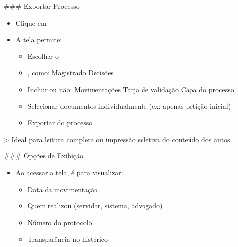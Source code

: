 \documentclass[letterpaper,10pt,brazil]{sphinxmanual}
\begin{document}
\sphinxAtStartPar
\#\#\# Exportar Processo
\begin{itemize}
\item {} 
\sphinxAtStartPar
Clique em 

\item {} 
\sphinxAtStartPar
A tela permite:
\begin{itemize}
\item {} 
\sphinxAtStartPar
Escolher o 

\item {} 
\sphinxAtStartPar
{}, como:
\sphinxhyphen{} Magistrado
\sphinxhyphen{} Decisões

\item {} 
\sphinxAtStartPar
Incluir ou não:
\sphinxhyphen{} Movimentações
\sphinxhyphen{} Tarja de validação
\sphinxhyphen{} Capa do processo

\item {} 
\sphinxAtStartPar
Selecionar documentos individualmente (ex: apenas petição inicial)

\item {} 
\sphinxAtStartPar
Exportar  do processo

\end{itemize}

\end{itemize}

\sphinxAtStartPar
\textgreater{} Ideal para leitura completa ou impressão seletiva do conteúdo dos autos.

\sphinxAtStartPar
\#\#\# Opções de Exibição
\begin{itemize}
\item {} 
\sphinxAtStartPar
Ao acessar a tela, é  para visualizar:
\begin{itemize}
\item {} 
\sphinxAtStartPar
Data da movimentação

\item {} 
\sphinxAtStartPar
Quem realizou (servidor, sistema, advogado)

\item {} 
\sphinxAtStartPar
Número do protocolo

\item {} 
\sphinxAtStartPar
Transparência no histórico

\end{itemize}

\end{itemize}
\end{document}
